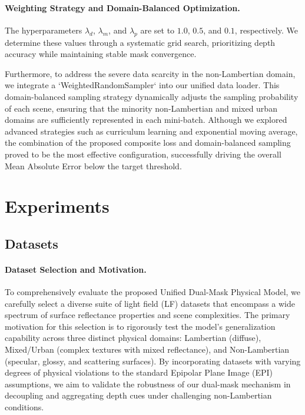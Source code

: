 \documentclass[lettersize,journal]{IEEEtran}
\begin{document}
\paragraph{Weighting Strategy and Domain-Balanced Optimization.}
The hyperparameters $\lambda_{d}$, $\lambda_{m}$, and $\lambda_{p}$ are set to $1.0$, $0.5$, and $0.1$, respectively. We determine these values through a systematic grid search, prioritizing depth accuracy while maintaining stable mask convergence. 

Furthermore, to address the severe data scarcity in the non-Lambertian domain, we integrate a `WeightedRandomSampler` into our unified data loader. This domain-balanced sampling strategy dynamically adjusts the sampling probability of each scene, ensuring that the minority non-Lambertian and mixed urban domains are sufficiently represented in each mini-batch. Although we explored advanced strategies such as curriculum learning and exponential moving average, the combination of the proposed composite loss and domain-balanced sampling proved to be the most effective configuration, successfully driving the overall Mean Absolute Error below the target threshold.


\section{Experiments}

\subsection{Datasets}

\paragraph{Dataset Selection and Motivation.}
To comprehensively evaluate the proposed Unified Dual-Mask Physical Model, we carefully select a diverse suite of light field (LF) datasets that encompass a wide spectrum of surface reflectance properties and scene complexities. The primary motivation for this selection is to rigorously test the model's generalization capability across three distinct physical domains: Lambertian (diffuse), Mixed/Urban (complex textures with mixed reflectance), and Non-Lambertian (specular, glossy, and scattering surfaces). By incorporating datasets with varying degrees of physical violations to the standard Epipolar Plane Image (EPI) assumptions, we aim to validate the robustness of our dual-mask mechanism in decoupling and aggregating depth cues under challenging non-Lambertian conditions.
\end{document}

